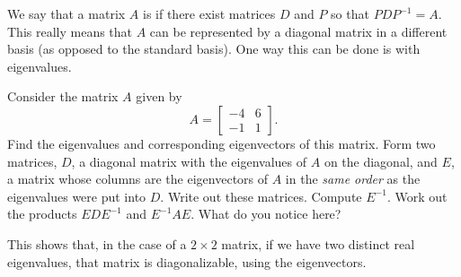 \documentclass{ximera}
\begin{document}
\begin{exercise} \label{ex:diagonalization}
    We say that a matrix $A$ is \emph{} if there exist matrices $D$ and $P$ so that $PDP^{-1} = A$. This really means that $A$ can be represented by a diagonal matrix in a different basis (as opposed to the standard basis). One way this can be done is with eigenvalues.
    \begin{tasks}
        \task Consider the matrix $A$ given by 
            \[ A = \begin{bmatrix} -4 & 6 \\ -1 & 1 \end{bmatrix}. \]
            Find the eigenvalues and corresponding eigenvectors of this matrix.
        \task Form two matrices, $D$, a diagonal matrix with the eigenvalues of $A$ on the diagonal, and $E$, a matrix whose columns are the eigenvectors of $A$ in the \emph{same order} as the eigenvalues were put into $D$. Write out these matrices.
        \task Compute $E^{-1}$. 
        \task Work out the products $EDE^{-1}$ and $E^{-1}AE$. What do you notice here?
    \end{tasks}
    This shows that, in the case of a $2\times 2$ matrix, if we have two distinct real eigenvalues, that matrix is diagonalizable, using the eigenvectors.
\end{exercise}
\end{document}
